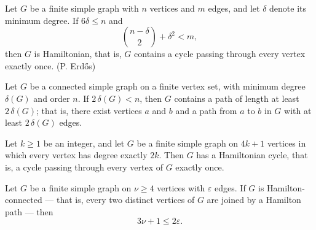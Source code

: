 \begin{theorem}
\label{SimpleGraph.erdos_hamiltonian}
Let $G$ be a finite simple graph with $n$ vertices and $m$ edges, and let $\delta$
denote its minimum degree. If $6\delta \le n$ and
\[
\binom{n-\delta}{2} + \delta^2 < m,
\]
then $G$ is Hamiltonian, that is, $G$ contains a cycle passing through every vertex
exactly once. (P. Erdős)
\end{theorem}

\begin{theorem}
\label{SimpleGraph.long_path_of_order_gt_two_minDegree}
Let $G$ be a connected simple graph on a finite vertex set, with minimum degree
$\delta(G)$ and order $n$. If $2\,\delta(G) < n$, then $G$ contains a path of length at
least $2\,\delta(G)$; that is, there exist vertices $a$ and $b$ and a path from $a$ to
$b$ in $G$ with at least $2\,\delta(G)$ edges.
\end{theorem}

\begin{theorem}
\label{SimpleGraph.nash_williams_regular_hamiltonian}
Let $k \ge 1$ be an integer, and let $G$ be a finite simple graph on $4k+1$ vertices in
which every vertex has degree exactly $2k$. Then $G$ has a Hamiltonian cycle, that is, a
cycle passing through every vertex of $G$ exactly once.
\end{theorem}

\begin{theorem}
\label{SimpleGraph.hamiltonConnected_edge_bound}
Let $G$ be a finite simple graph on $\nu \ge 4$ vertices with $\varepsilon$ edges. If
$G$ is Hamilton-connected — that is, every two distinct vertices of $G$ are joined by a
Hamilton path — then \[3\nu + 1 \le 2\varepsilon.\]
\end{theorem}
